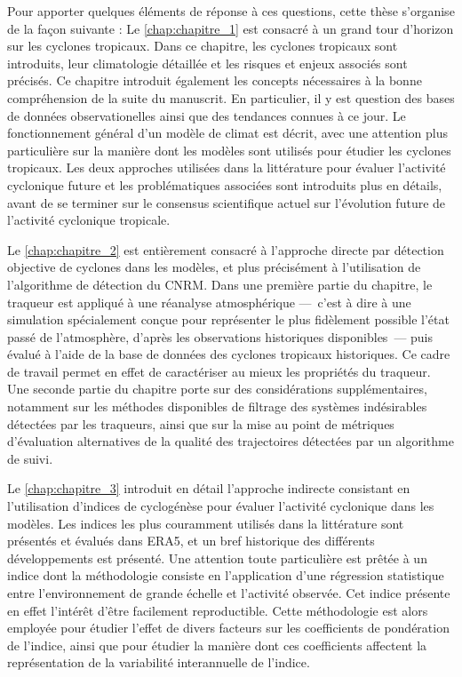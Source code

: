 \documentclass[../main.tex]{subfiles}
\begin{document}
Pour apporter quelques éléments de réponse à ces questions, cette thèse s'organise de la façon suivante : Le \cref{chap:chapitre_1} est consacré à un grand tour
d'horizon sur les cyclones tropicaux. Dans ce chapitre, les cyclones tropicaux sont introduits, leur climatologie détaillée et les risques et enjeux associés
sont précisés. Ce chapitre introduit également les concepts nécessaires à la bonne compréhension de la suite du manuscrit. En particulier, il y est question des
bases de données observationelles ainsi que des tendances connues à ce jour. Le fonctionnement général d'un modèle de climat est décrit, avec une attention
plus particulière sur la manière dont les modèles sont utilisés pour étudier les cyclones tropicaux. Les deux approches utilisées dans la littérature pour
évaluer l'activité cyclonique future et les problématiques associées sont introduits plus en détails, avant de se terminer sur le consensus scientifique actuel
sur l'évolution future de l'activité cyclonique tropicale.

Le \cref{chap:chapitre_2} est entièrement consacré à l'approche directe par détection objective de cyclones dans les modèles, et plus précisément à
l'utilisation de l'algorithme de détection du CNRM. Dans une première partie du chapitre, le traqueur est appliqué à une réanalyse atmosphérique ---~c'est à
dire à une simulation spécialement conçue pour représenter le plus fidèlement possible l'état passé de l'atmosphère, d'après les observations historiques
disponibles~--- puis évalué à l'aide de la base de données des cyclones tropicaux historiques. Ce cadre de travail permet en effet de caractériser au mieux les
propriétés du traqueur. Une seconde partie du chapitre porte sur des considérations supplémentaires, notamment sur les méthodes disponibles de filtrage des
systèmes indésirables détectées par les traqueurs, ainsi que sur la mise au point de métriques d'évaluation alternatives de la qualité des trajectoires
détectées par un algorithme de suivi.

Le \cref{chap:chapitre_3} introduit en détail l'approche indirecte consistant en l'utilisation d’indices de cyclogénèse pour évaluer l'activité cyclonique dans
les modèles. Les indices les plus couramment utilisés dans la littérature sont présentés et évalués dans ERA5, et un bref historique des différents
développements est présenté. Une attention toute particulière est prêtée à un indice dont la méthodologie consiste en l'application d'une régression statistique
entre l'environnement de grande échelle et l'activité observée. Cet indice présente en effet l'intérêt d'être facilement reproductible. Cette méthodologie est
alors employée pour étudier l'effet de divers facteurs sur les coefficients de pondération de l'indice, ainsi que pour étudier la manière dont ces coefficients
affectent la représentation de la variabilité interannuelle de l'indice.
\end{document}
